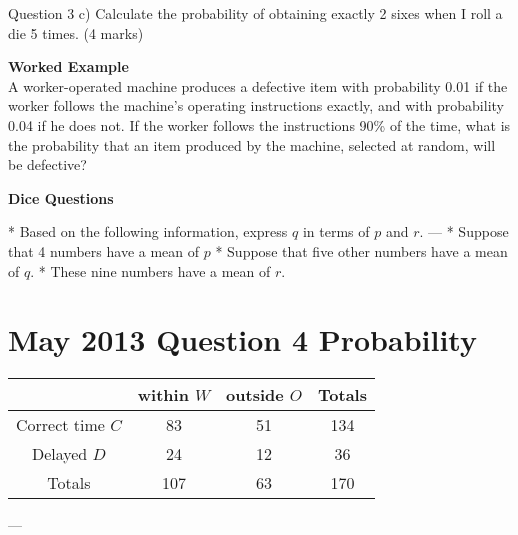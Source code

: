 Question 3
c) Calculate the probability of obtaining exactly 2 sixes when I roll a die 5 times.
(4 marks)

\noindent \textbf{Worked Example}\\
A worker-operated machine produces a defective item with probability 0.01 if the worker follows the machine’s operating instructions exactly, and with probability 0.04 if he does not. If the worker follows the instructions 90\% of the time, what is the probability that an item produced by the machine, selected at random, will be defective?







\textbf{Dice Questions}
\begin{enumerate}

* Based on the following information, express $q$ in terms of $p$ and $r$.
--- 
* Suppose that 4 numbers have a mean of $p$
* Suppose that five other numbers have a mean of $q$.
* These nine numbers have a mean of $r$.



\end{enumerate}

\section*{May 2013 Question 4 Probability}
\begin{center}
\begin{tabular}{|c|c|c|c|}
\hline  & within $W$ & outside $O$ & Totals \\ 
\hline Correct time $C$ & 83 & 51 & 134 \\ 
\hline Delayed $D$ & 24 & 12 & 36 \\ 
\hline Totals & 107 & 63 & 170 \\ 
\hline 
\end{tabular} 
\end{center}--- 


